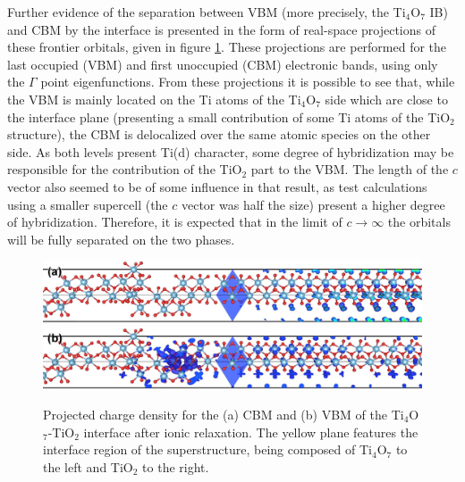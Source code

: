 Further evidence of the separation between VBM (more precisely, the Ti$_4$O$_7$ IB) and CBM by the interface is presented in the form of real-space projections of these frontier orbitals, given in figure \ref{fig:parchg-bo}. These projections are performed for the last occupied (VBM) and first unoccupied (CBM) electronic bands, using only the $\Gamma$ point eigenfunctions. From these projections it is possible to see that, while the VBM is mainly located on the Ti atoms of the Ti$_4$O$_7$ side which are close to the interface plane (presenting a small contribution of some Ti atoms of the TiO$_2$ structure), the CBM is delocalized over the same atomic species on the other side. As both levels present Ti(d) character, some degree of hybridization may be responsible for the contribution of the TiO$_2$ part to the VBM. The length of the $c$ vector also seemed to be of some influence in that result, as test calculations using a smaller supercell (the $c$ vector was half the size) present a higher degree of hybridization. Therefore, it is expected that in the limit of $c \rightarrow \infty$ the orbitals will be fully separated on the two phases.
\begin{center}
 \begin{figure}[ht!]
   \includegraphics[width=\columnwidth]{img/parchg-cbm-gamma-ti4o7-tio2-new.jpg}
   \includegraphics[width=\columnwidth]{img/parchg-vbm-gamma-ti4o7-tio2-new.jpg}
  \caption{Projected charge density for the (a) CBM and (b) VBM of the Ti${}_4$O${}_7$-TiO${}_2$ interface after ionic relaxation. The yellow plane features the interface region of the superstructure, being composed of Ti${}_4$O${}_7$ to the left and TiO${}_2$ to the right.}
  \label{fig:parchg-bo}
 \end{figure}
\end{center}

